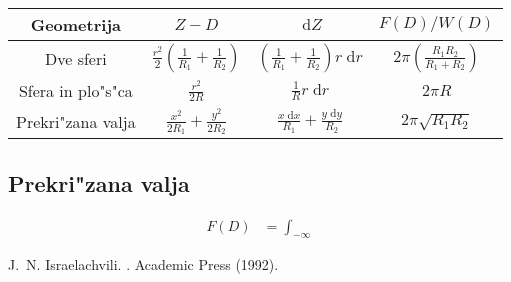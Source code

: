 \documentclass[a4paper,10pt]{article}
\newcommand{\dd}{\;\mathrm{d}}
\begin{document}
\begin{table}[h]
\begin{tabular}{c|c|c|c}
 Geometrija & $Z - D$ & $\dd Z$ & $F(D) / W(D)$ \\
 \hline
 Dve sferi & $\frac{r^2}{2} \left(\frac{1}{R_1} + \frac{1}{R_2}\right)$ & $\left(\frac{1}{R_1} + \frac{1}{R_2}\right)r \dd r$ & $2\pi \left(\frac{R_1R_2}{R_1 + R_2}\right)$ \\
 \hline
 Sfera in plo"s"ca & $\frac{r^2}{2R}$ & $\frac{1}{R} r \dd r$ & $2\pi R$ \\
 \hline
 Prekri"zana valja & $\frac{x^2}{2R_1} + \frac{y^2}{2R_2}$ & $\frac{x \dd x}{R_1} + \frac{y \dd y}{R_2}$ & $2\pi \sqrt{R_1R_2}$
\end{tabular}
\end{table}

\subsection{Prekri"zana valja}

\begin{align}
 F(D) &= \int_{-\infty}
\end{align}



\begin{thebibliography}{10}

J.~N. Israelachvili.
.
\newblock Academic Press (1992).



\end{thebibliography}
\end{document}

